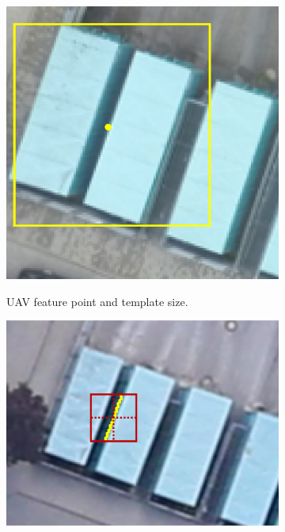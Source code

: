 \begin{figure}[tbp]
    \centering
       \begin{subfigure}[tbp]{0.263\columnwidth}
           \centering
           \includegraphics[width=\textwidth]{figures_4/refine_uav.png}
           \caption[]{UAV feature point and template size.}%
           {{\small }}
           \label{fig:refine_a}
       \end{subfigure}
       \hfill
       \begin{subfigure}[tbp]{0.35\columnwidth}  
           \centering 
           \includegraphics[width=\textwidth]{figures_4/refine_air_geom.png}

\end{subfigure}
\end{figure}
